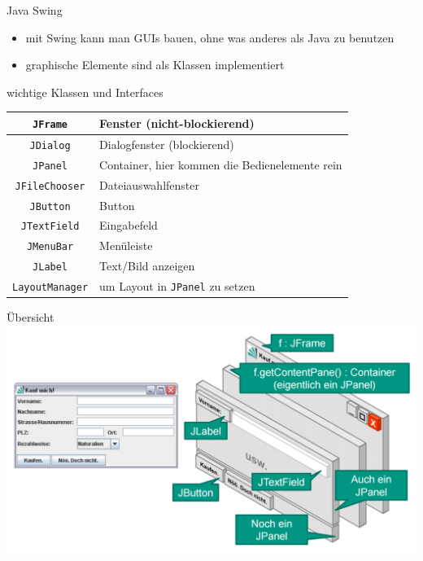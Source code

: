 \documentclass[18pt]{beamer}
\begin{document}
\begin{frame}{Java Swing}
	\begin{itemize}
		\item mit Swing kann man GUIs bauen, ohne was anderes als Java zu benutzen
		\item graphische Elemente sind als Klassen implementiert
	\end{itemize}
	wichtige Klassen und Interfaces
	\begin{table}
		\begin{tabular}{c|l}
			\texttt{JFrame} & Fenster (nicht-blockierend) \\
			\hline
			\texttt{JDialog} & Dialogfenster (blockierend) \\
			\hline
			\texttt{JPanel} & Container, hier kommen die Bedienelemente rein\\
			\hline
			\texttt{JFileChooser} & Dateiauswahlfenster \\
			\hline
			\texttt{JButton} & Button \\
			\hline
			\texttt{JTextField} & Eingabefeld \\
			\hline
			\texttt{JMenuBar} & Menüleiste \\
			\hline
			\texttt{JLabel} & Text/Bild anzeigen \\
			\hline
			\texttt{LayoutManager} & um Layout in \texttt{JPanel} zu setzen 
		\end{tabular}
	\end{table}
\end{frame}

\begin{frame}{Übersicht}
	\centering 
	\includegraphics[scale=0.35]{pics/tut3/swing.png}
\end{frame}
\end{document}
